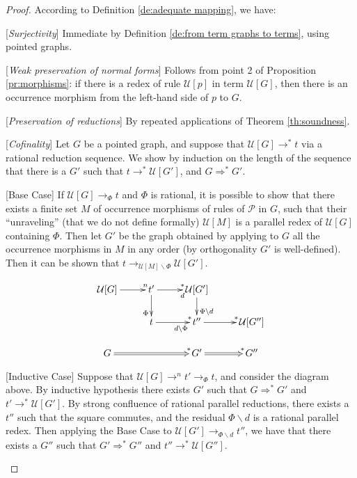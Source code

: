 \documentclass{eptcs}
\theoremstyle{plain}
\theoremstyle{definition}
\begin{document}
\begin{proof}
According to Definition \ref{de:adequate mapping}, we have:
\begin{description}
\item {[{\em Surjectivity}]} Immediate by Definition \ref{de:from term 
graphs to terms}, using pointed graphs.

\item {[{\em Weak preservation of normal forms}]} Follows  
from point 2 of Proposition \ref{pr:morphisms}: if there is a redex of 
rule $\mathcal{U}[p]$ in term $\mathcal{U}[G]$, then there is an occurrence 
morphism from the left-hand side of $p$ to $G$.  
\item {[{\em Preservation of reductions}]} By repeated applications of 
Theorem \ref{th:soundness}.

\item {[{\em Cofinality}]} Let $G$ be a pointed graph, and suppose 
that $\mathcal{U}[G] \rightarrow^* t$ via a rational reduction sequence. 
We show by induction on the length of the sequence that there is a 
$G'$ such that $t \rightarrow^* \mathcal{U}[G']$, and $G \Rightarrow^* 
G'$.

\begin{description} 

\item {[Base Case]} If  $\mathcal{U}[G] \rightarrow_\Phi t$ and $\Phi$ is 
rational, it is possible to show that there exists a finite set $M$ of 
occurrence morphisms of rules of $\mathcal{P}$ in $G$, such that their 
``unraveling'' (that we do not define formally) $\mathcal{U}[M]$ is a 
parallel redex of $\mathcal{U}[G]$ containing $\Phi$. Then let $G'$ be 
the graph obtained 
by applying to $G$ all the occurrence morphisms in $M$ in any order 
(by orthogonality $G'$ is well-defined). Then it can be shown that $t 
\rightarrow_{\mathcal{U}[M] \backslash \Phi} \mathcal{U}[G']$.

$$\xymatrix@C=6ex@R=4ex{
\mathcal{U}[G] \ar[r]^>n & t' \ar[r]^>{*} _>{d} \ar[d]_>>{\Phi}
& \mathcal{U}[G'] \ar[d]^>>{\Phi \backslash d} & \\
& t \ar[r] ^>{*} _>>>>{d\backslash \Phi} & t'' \ar[r]^>{*} & \mathcal{U}[G'']\\
G \ar@{=>}[rr]^>{*} & &  G' \ar@{=>}[r] ^>{*} & G''
}$$ 



\item {[Inductive Case]}  Suppose that $\mathcal{U}[G] \rightarrow^{n} t' 
\rightarrow_\Phi t$, and consider the diagram above.
By 
inductive hypothesis there exists $G'$ such 
that $G \Rightarrow^* G'$ and $t' \rightarrow^* \mathcal{U}[G']$. By 
strong confluence of rational parallel reductions, there exists a 
$t''$ such that the square commutes, and the residual $\Phi 
\backslash d$ is a rational parallel redex. Then applying the Base 
Case to $\mathcal{U}[G'] \rightarrow_{\Phi \backslash d} t''$, we have 
that there exists a $G''$ such that $G' \Rightarrow^* G''$ and $t'' 
\rightarrow^* \mathcal{U}[G'']$. 
\end{description}
\end{description}
\end{proof}
\end{document}
